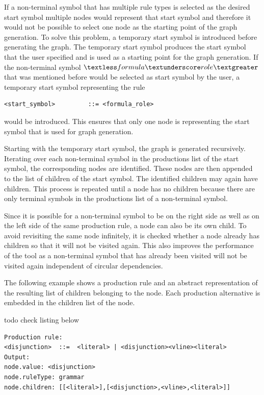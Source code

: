 If a non-terminal symbol that has multiple rule types is selected as the desired start symbol multiple nodes would represent that start symbol and therefore it would not be possible to select one node as the starting point of the graph generation.
To solve this problem, a temporary start symbol is introduced before generating the graph.
The temporary start symbol produces the start symbol that the user specified and is used as a starting point for the graph generation.
If the non-terminal symbol $\textless formula\textunderscore role\textgreater$ that was mentioned before would be selected as start symbol by the user, a temporary start symbol representing the rule
\begin{lstlisting}[caption= Rule of the temporary start symbol]
<start_symbol>         ::= <formula_role>
\end{lstlisting}
would be introduced.
This ensures that only one node is representing the start symbol that is used for graph generation.

Starting with the temporary start symbol, the graph is generated recursively. Iterating over each non-terminal symbol in the productions list of the start symbol, the corresponding nodes are identified. These nodes are then appended to the list of children of the start symbol. The identified children may again have children. This process is repeated until a node has no children because there are only terminal symbols in the productions list of a non-terminal symbol.

Since it is possible for a non-terminal symbol to be on the right side as well as on the left side of the same production rule, a node can also be its own child. To avoid revisiting the same node infinitely, it is checked whether a node already has children so that it will not be visited again. This also improves the performance of the tool as a non-terminal symbol that has already been visited will not be visited again independent of circular dependencies.

The following example shows a production rule and an abstract representation of the resulting list of children belonging to the node. Each production alternative is embedded in the children list of the node. %

todo check listing below
\begin{lstlisting}[caption= Rule and resulting list of children]
Production rule:
<disjunction>  ::=  <literal> | <disjunction><vline><literal>
Output:
node.value: <disjunction>
node.ruleType: grammar
node.children: [[<literal>],[<disjunction>,<vline>,<literal>]]
\end{lstlisting}


